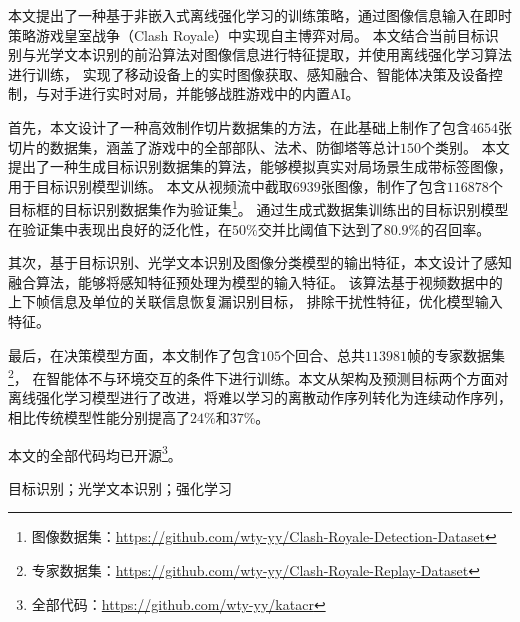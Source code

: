 
\clearpage
\titlespacing{\chapter}{0pt}{0mm}{5mm}

本文提出了一种基于非嵌入式离线强化学习的训练策略，通过图像信息输入在即时策略游戏皇室战争（Clash Royale）中实现自主博弈对局。
本文结合当前目标识别与光学文本识别的前沿算法对图像信息进行特征提取，并使用离线强化学习算法进行训练，
实现了移动设备上的实时图像获取、感知融合、智能体决策及设备控制，与对手进行实时对局，并能够战胜游戏中的内置AI。

首先，本文设计了一种高效制作切片数据集的方法，在此基础上制作了包含$4654$张切片的数据集，涵盖了游戏中的全部部队、法术、防御塔等总计$150$个类别。
本文提出了一种生成目标识别数据集的算法，能够模拟真实对局场景生成带标签图像，用于目标识别模型训练。
本文从视频流中截取$6939$张图像，制作了包含$116878$个目标框的目标识别数据集作为验证集\footnote{图像数据集：\url{https://github.com/wty-yy/Clash-Royale-Detection-Dataset}\hfill}。
通过生成式数据集训练出的目标识别模型在验证集中表现出良好的泛化性，在$50\%$交并比阈值下达到了$80.9\%$的召回率。

其次，基于目标识别、光学文本识别及图像分类模型的输出特征，本文设计了感知融合算法，能够将感知特征预处理为模型的输入特征。
该算法基于视频数据中的上下帧信息及单位的关联信息恢复漏识别目标，
排除干扰性特征，优化模型输入特征。

最后，在决策模型方面，本文制作了包含$105$个回合、总共$113981$帧的专家数据集\footnote{专家数据集：\url{https://github.com/wty-yy/Clash-Royale-Replay-Dataset}\hfill}，
在智能体不与环境交互的条件下进行训练。本文从架构及预测目标两个方面对离线强化学习模型进行了改进，将难以学习的离散动作序列转化为连续动作序列，
相比传统模型性能分别提高了$24\%$和$37\%$。

本文的全部代码均已开源\footnote{全部代码：\url{https://github.com/wty-yy/katacr}}。

\vspace{\baselineskip}
 目标识别；光学文本识别；强化学习

